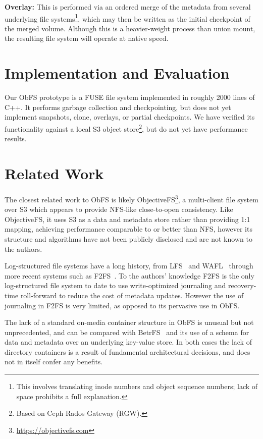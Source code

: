 \documentclass[sigconf,anonymous,10pt]{acmart}
\begin{document}
\begin{CCSXML}
\noindent \textbf{Overlay:} This is performed via an ordered merge of the metadata from several underlying file systems\footnote{This involves translating inode numbers and object sequence numbers; lack of space prohibits a full explanation.}, which may then be written as the initial checkpoint of the merged volume.
Although this is a heavier-weight process than union mount, the resulting file system will operate at native speed.



\section{Implementation and Evaluation}

Our ObFS prototype is a FUSE file system implemented in roughly 2000 lines of C++.
It performs garbage collection and checkpointing, but does not yet implement snapshots, clone, overlays, or partial checkpoints.
We have verified its functionality against a local S3 object store\footnote{Based on Ceph Rados Gateway (RGW).}, but do not yet have performance results.

\section{Related Work}
The closest related work to ObFS is likely ObjectiveFS\footnote{\url{https://objectivefs.com}}, a multi-client file system over S3 which appears to provide NFS-like close-to-open consistency.
Like ObjectiveFS, it uses S3 as a data and metadata store rather than providing 1:1 mapping, achieving performance comparable to or better than NFS, however its structure and algorithms have not been publicly disclosed and are not known to the authors.

Log-structured file systems have a long history, from LFS~\cite{rosenblum_design_1991} and WAFL~\cite{hitz_file_1994} through more recent systems such as F2FS~\cite{lee_f2fs_2015}.
To the authors' knowledge F2FS is the only log-structured file system to date to use write-optimized journaling and recovery-time roll-forward to reduce the cost of metadata updates.
However the use of journaling in F2FS is very limited, as opposed to its pervasive use in ObFS.

The lack of a standard on-media container structure in ObFS is unusual but not unprecedented, and can be compared with BetrFS~\cite{jannen_betrfs_2015} and its use of a schema for data and metadata over an underlying key-value store.
In both cases the lack of directory containers is a result of fundamental architectural decisions, and does not in itself confer any benefits.


\end{CCSXML}
\end{document}

